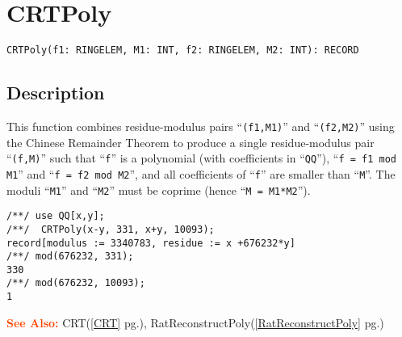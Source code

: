 \documentclass[a4paper]{mybook}
\newenvironment{command}{}{} %
\newcommand\SeeAlso{\par\textcolor{OrangeRed}{\textbf{\large See Also: }}}
\begin{document}
\section{CRTPoly}
\label{CRTPoly}
\begin{command} %


\begin{Verbatim}[label=syntax, rulecolor=\color{MidnightBlue},
frame=single]
CRTPoly(f1: RINGELEM, M1: INT, f2: RINGELEM, M2: INT): RECORD
\end{Verbatim}


\subsection*{Description}

This function combines residue-modulus pairs ``\verb&(f1,M1)&'' and ``\verb&(f2,M2)&''
using the Chinese Remainder Theorem to produce a single
residue-modulus pair ``\verb&(f,M)&'' such that 
``\verb&f&'' is a polynomial (with coefficients in ``\verb&QQ&''),
``\verb&f = f1 mod M1&'' and ``\verb&f = f2 mod M2&'',
and all coefficients of ``\verb&f&'' are smaller than ``\verb&M&''.
The moduli ``\verb&M1&'' and ``\verb&M2&'' must be coprime (hence ``\verb&M = M1*M2&'').
\begin{Verbatim}[label=example, rulecolor=\color{PineGreen}, frame=single]
/**/ use QQ[x,y];
/**/  CRTPoly(x-y, 331, x+y, 10093);
record[modulus := 3340783, residue := x +676232*y]
/**/ mod(676232, 331);
330
/**/ mod(676232, 10093);
1
\end{Verbatim}


\SeeAlso %
  CRT(\ref{CRT} pg.\pageref{CRT}), 
    RatReconstructPoly(\ref{RatReconstructPoly} pg.\pageref{RatReconstructPoly})
\end{command} %
\end{document}
